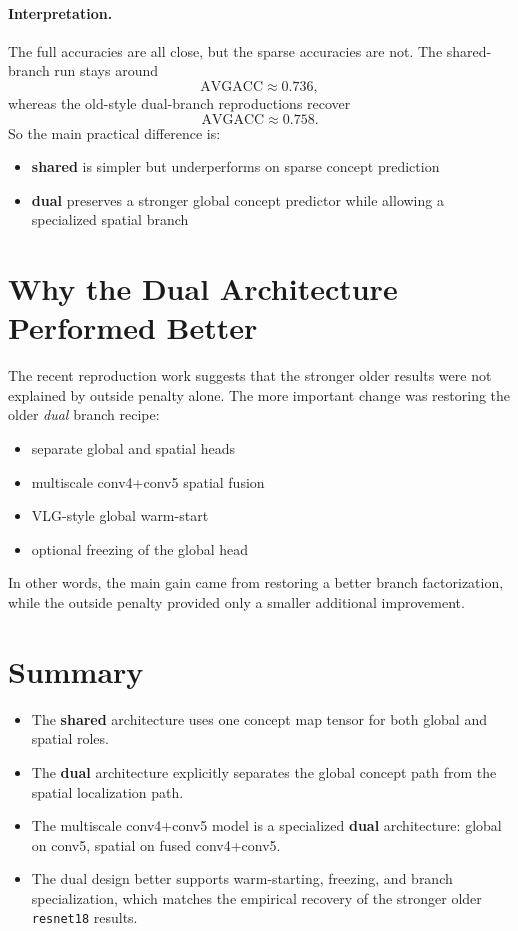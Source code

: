 \documentclass[11pt]{article}
\begin{document}
\paragraph{Interpretation.}
The full accuracies are all close, but the sparse accuracies are not. The
shared-branch run stays around
\[
\text{AVGACC} \approx 0.736,
\]
whereas the old-style dual-branch reproductions recover
\[
\text{AVGACC} \approx 0.758.
\]
So the main practical difference is:
\begin{itemize}
    \item \textbf{shared} is simpler but underperforms on sparse concept
    prediction
    \item \textbf{dual} preserves a stronger global concept predictor while
    allowing a specialized spatial branch
\end{itemize}

\section{Why the Dual Architecture Performed Better}
The recent reproduction work suggests that the stronger older results were not
explained by outside penalty alone. The more important change was restoring the
older \emph{dual} branch recipe:
\begin{itemize}
    \item separate global and spatial heads
    \item multiscale conv4+conv5 spatial fusion
    \item VLG-style global warm-start
    \item optional freezing of the global head
\end{itemize}
In other words, the main gain came from restoring a better branch factorization,
while the outside penalty provided only a smaller additional improvement.

\section{Summary}
\begin{itemize}
    \item The \textbf{shared} architecture uses one concept map tensor for both
    global and spatial roles.
    \item The \textbf{dual} architecture explicitly separates the global concept
    path from the spatial localization path.
    \item The multiscale conv4+conv5 model is a specialized \textbf{dual}
    architecture: global on conv5, spatial on fused conv4+conv5.
    \item The dual design better supports warm-starting, freezing, and branch
    specialization, which matches the empirical recovery of the stronger older
    \texttt{resnet18} results.
\end{itemize}
\end{document}
